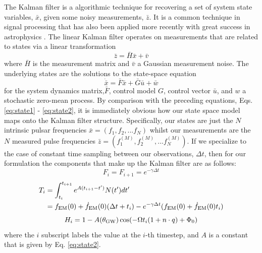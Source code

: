 \documentclass[fleqn,usenatbib,useAMS]{mnras}
\begin{document}
The Kalman filter \citep{Kalman1} is a algorithmic technique for recovering a set of system state variables, $\bar{x}$, given some noisy measurements, $\bar{z}$. It is a common technique in signal processing that has also been applied more recently with great success in astrophysics \citep[e.g.][]{Meyers2021,Melatos2023}. The linear Kalman filter operates on measurements that are related to states via a linear transformation
\begin{equation}
	\bar{z} = \bar{H} \bar{x} + \bar{v}
\end{equation}
where $\bar{H}$ is the measurement matrix and $\bar{v}$ a Gaussian measurement noise. The underlying states are the solutions to the state-space equation 
\begin{equation}
	\dot{\bar{x}} = \bar{F} \bar{x} + \bar{G}\bar{u} + \bar{w}
\end{equation}
for the system dynamics matrix,$\bar{F}$,  control model $G$, control vector $\bar{u}$, and $w$ a stochastic zero-mean process. By comparison with the preceding equations, Eqs. 	\ref{eq:state1} - 	\ref{eq:state2}, it is immediately obvious how our state space model maps onto the Kalman filter structure. Specifically, our states are just the $N$ intrinsic pulsar frequencies $\bar{x} = (f_1,f_2,...f_N)$ whilst our measurements are the $N$ measured pulse frequencies $\bar{z} = (f^{(M)}_1,f^{(M)}_2,...f^{(M)}_N)$. If we specialize to the case of constant time sampling between our observations, $\Delta t$, then for our formulation the components that make up the Kalman filter are as follows: 
\begin{equation}
	F_i = F_{i+1} = e^{-\gamma \Delta t}
	\label{eq:fmatrix}
\end{equation}
\begin{align}
	T_i &= \int_{t_i}^{t_{i+1}}  e^{A (t_{i+1} - t')} N(t') dt' \\
	    & = f_{\rm EM}(0) + \dot{f}_{\rm EM}(0)  (\Delta t + t_i) - e^{-\gamma \Delta t} (f_{\rm EM}(0) + \dot{f}_{\rm EM}(0)t_i)
\end{align}
\begin{equation}
	H_i = 1 -A(\theta_{\rm GW}) \cos(-\Omega t_i (1 + n\cdot q ) + \Phi_0)
\end{equation}
where the $i$ subscript labels the value at the $i$-th timestep, and $A$ is a constant that is given by  Eq. \ref{eq:state2}. \newline 
\end{document}
